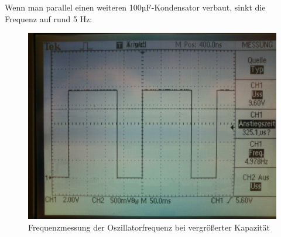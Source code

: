 Wenn man parallel einen weiteren 100µF-Kondensator verbaut, sinkt die Frequenz auf rund 5 Hz:
\begin{figure}[H]
	\centering
	\includegraphics[width=\linewidth]{versuch3/oszi/DSC_0268.JPG}
	\caption{Frequenzmessung der Oszillatorfrequenz bei vergrößerter Kapazität}
\end{figure}

